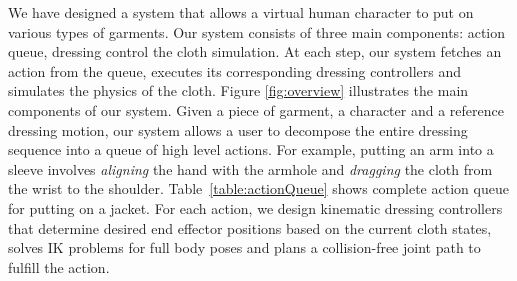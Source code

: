 We have designed a system that allows a virtual human character to put on various types of garments. Our system consists of three main components: action queue, dressing control the cloth simulation.
At each step, our system fetches an action from the queue,
executes its corresponding dressing controllers and simulates the physics of the cloth. Figure \ref{fig:overview} illustrates the main components of our system. 
Given a piece of garment, a character and a reference dressing motion, our system allows a user to decompose the entire
dressing sequence into a queue of high level actions. For example, putting an arm into a sleeve involves \emph{aligning} the hand with the armhole and
\emph{dragging} the cloth from the wrist to the shoulder. 
Table~\ref{table:actionQueue} shows complete action queue for putting on a jacket.
For each action, we design kinematic dressing controllers that determine desired end effector positions based on the current cloth states, solves IK problems for full body poses and plans a collision-free joint path to fulfill the action. 


